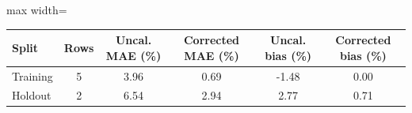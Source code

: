 \begin{center}
    \centering
    \small
    \label{tab:calibration-holdout-screen}
    \renewcommand{\arraystretch}{1.2}
    \begin{adjustbox}{max width=\textwidth}
    \begin{tabular}{lccccc}
        \toprule
        \textbf{Split} & \textbf{Rows} & \textbf{Uncal. MAE (\%)} & \textbf{Corrected MAE (\%)} & \textbf{Uncal. bias (\%)} & \textbf{Corrected bias (\%)} \\
        \midrule
        Training & 5 & 3.96 & 0.69 & -1.48 & 0.00 \\
        Holdout & 2 & 6.54 & 2.94 & 2.77 & 0.71 \\
        \bottomrule
    \end{tabular}
    \end{adjustbox}
\end{center}
